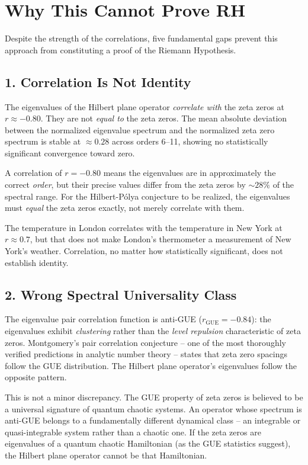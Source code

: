 \documentclass[11pt,a4paper]{article}
\begin{document}
\section{Why This Cannot Prove RH}

Despite the strength of the correlations, five fundamental gaps prevent
this approach from constituting a proof of the Riemann Hypothesis.

\subsection{1. Correlation Is Not Identity}

The eigenvalues of the Hilbert plane operator \emph{correlate with} the
zeta zeros at $r \approx -0.80$.  They are not \emph{equal to} the zeta
zeros.  The mean absolute deviation between the normalized eigenvalue
spectrum and the normalized zeta zero spectrum is stable at $\approx 0.28$
across orders 6--11, showing no statistically significant convergence
toward zero.

A correlation of $r = -0.80$ means the eigenvalues are in approximately
the correct \emph{order}, but their precise values differ from the zeta
zeros by $\sim 28\%$ of the spectral range.  For the Hilbert-P\'{o}lya
conjecture to be realized, the eigenvalues must \emph{equal} the zeta
zeros exactly, not merely correlate with them.

The temperature in London correlates with the temperature in New York at
$r \approx 0.7$, but that does not make London's thermometer a measurement
of New York's weather.  Correlation, no matter how statistically
significant, does not establish identity.

\subsection{2. Wrong Spectral Universality Class}

The eigenvalue pair correlation function is anti-GUE ($r_{\text{GUE}} =
-0.84$): the eigenvalues exhibit \emph{clustering} rather than the
\emph{level repulsion} characteristic of zeta zeros.  Montgomery's pair
correlation conjecture -- one of the most thoroughly verified predictions
in analytic number theory -- states that zeta zero spacings follow the
GUE distribution.  The Hilbert plane operator's eigenvalues follow the
opposite pattern.

This is not a minor discrepancy.  The GUE property of zeta zeros is
believed to be a universal signature of quantum chaotic systems.  An
operator whose spectrum is anti-GUE belongs to a fundamentally different
dynamical class -- an integrable or quasi-integrable system rather than
a chaotic one.  If the zeta zeros are eigenvalues of a quantum chaotic
Hamiltonian (as the GUE statistics suggest), the Hilbert plane operator
cannot be that Hamiltonian.
\end{document}
